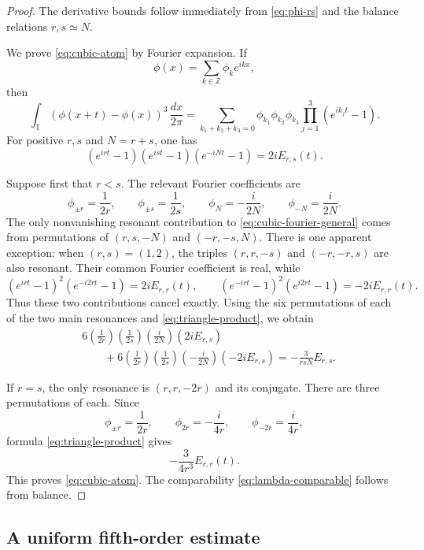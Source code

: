\documentclass[10pt,a4paper]{amsart}
\newcommand{\T}{\mathbb T}
\newcommand{\Z}{\mathbb Z}
\begin{document}
\begin{proof}
The derivative bounds follow immediately from \eqref{eq:phi-rs} and the balance relations $r,s\simeq N$.

We prove \eqref{eq:cubic-atom} by Fourier expansion.  If
\[
 \phi(x)=\sum_{k\in\Z}\phi_k e^{ikx},
\]
then
\begin{equation}\label{eq:cubic-fourier-general}
 \int_\T(\phi(x+t)-\phi(x))^3\,\frac{dx}{2\pi}
 =\sum_{k_1+k_2+k_3=0}
 \phi_{k_1}\phi_{k_2}\phi_{k_3}
 \prod_{j=1}^3(e^{ik_jt}-1).
\end{equation}
For positive $r,s$ and $N=r+s$, one has
\begin{equation}\label{eq:triangle-product}
 (e^{irt}-1)(e^{ist}-1)(e^{-iNt}-1)
 =2iE_{r,s}(t).
\end{equation}

Suppose first that $r<s$.  The relevant Fourier coefficients are
\[
 \phi_{\pm r}=\frac1{2r},
 \qquad
 \phi_{\pm s}=\frac1{2s},
 \qquad
 \phi_N=-\frac{i}{2N},
 \qquad
 \phi_{-N}=\frac{i}{2N}.
\]
The only nonvanishing resonant contribution to \eqref{eq:cubic-fourier-general} comes from permutations of $(r,s,-N)$ and $(-r,-s,N)$.  There is one apparent exception: when $(r,s)=(1,2)$, the triples $(r,r,-s)$ and $(-r,-r,s)$ are also resonant.  Their common Fourier coefficient is real, while
\[
 (e^{irt}-1)^2(e^{-i2rt}-1)=2iE_{r,r}(t),
 \qquad
 (e^{-irt}-1)^2(e^{i2rt}-1)=-2iE_{r,r}(t).
\]
Thus these two contributions cancel exactly.  Using the six permutations of each of the two main resonances and \eqref{eq:triangle-product}, we obtain
\begin{align*}
 &6\left(\frac1{2r}\right)
 \left(\frac1{2s}\right)
 \left(\frac{i}{2N}\right)(2iE_{r,s})\\
 &\qquad+
 6\left(\frac1{2r}\right)
 \left(\frac1{2s}\right)
 \left(-\frac{i}{2N}\right)(-2iE_{r,s})
 =-\frac{3}{rsN}E_{r,s}.
\end{align*}

If $r=s$, the only resonance is $(r,r,-2r)$ and its conjugate.  There are three permutations of each.  Since
\[
 \phi_{\pm r}=\frac1{2r},
 \qquad
 \phi_{2r}=-\frac{i}{4r},
 \qquad
 \phi_{-2r}=\frac{i}{4r},
\]
formula \eqref{eq:triangle-product} gives
\[
 -\frac{3}{4r^3}E_{r,r}(t).
\]
This proves \eqref{eq:cubic-atom}.  The comparability \eqref{eq:lambda-comparable} follows from balance.
\end{proof}


\subsection{A uniform fifth-order estimate}
\end{document}
